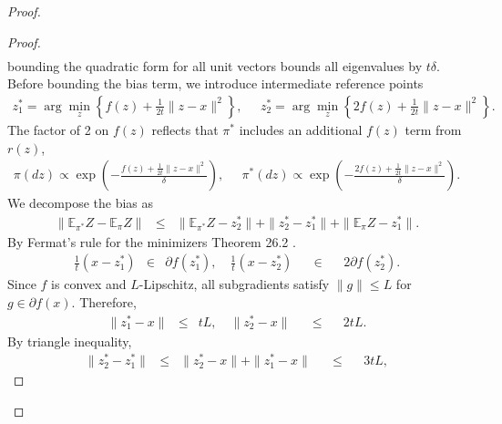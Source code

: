 \documentclass{article}
\newcommand{\E}{\mathbb{E}}
\newcommand{\amp}{\mathop{\:\:\,}\nolimits}
\theoremstyle{plain}
\theoremstyle{definition}
\theoremstyle{remark}
\begin{document}
\begin{proof}
\begin{proof}
\begin{eqnarray}
\end{eqnarray} 
bounding the quadratic form for all unit vectors bounds all eigenvalues by $t\delta$.
Before bounding the bias term, we introduce intermediate reference points
\begin{eqnarray}
    z_1^* = \arg\min_z\left\{f(z) + \frac{1}{2t}\|z-x\|^2\right\}, \amp  z_2^* = \arg\min_z\left\{2f(z) + \frac{1}{2t}\|z-x\|^2\right\}.
\end{eqnarray}
The factor of 2 on $f(z)$ reflects that $\pi^*$ includes an additional $f(z)$ term from $r(z)$,
\begin{eqnarray}
    \pi(dz) \propto \exp\left(-\frac{f(z) + \frac{1}{2t}\|z-x\|^2}{\delta}\right), \amp \pi^*(dz) \propto \exp\left(-\frac{2f(z) + \frac{1}{2t}\|z-x\|^2}{\delta}\right).
\end{eqnarray}
We decompose the bias as
\begin{eqnarray}
    \|\E_{\pi^*}Z - \E_{\pi}Z\| &\leq& \|\E_{\pi^*}Z - z_2^*\| + \|z_2^* - z_1^*\| + \|\E_\pi Z - z_1^*\|.
\end{eqnarray}
By Fermat's rule for the minimizers Theorem 26.2 \cite{bach2017}.
\begin{eqnarray}
    \frac{1}{t}(x-z_1^*) &\in& \partial f(z_1^*), \quad \frac{1}{t}(x-z_2^*)\amp\in \amp2\partial f(z_2^*).
\end{eqnarray}
Since $f$ is convex and $L$-Lipschitz, all subgradients satisfy $\|g\| \leq L$ for $g \in \partial f(x)$. Therefore,
\begin{eqnarray}
    \|z_1^* - x\| &\leq& tL, \quad \|z_2^* - x\| \amp\leq\amp 2tL.
\end{eqnarray}
By triangle inequality,
\begin{eqnarray}
    \|z_2^* - z_1^*\| &\leq& \|z_2^* - x\| + \|z_1^* - x\|\amp\leq\amp 3tL \label{eq: Triangle Inequality 3tL},
\end{eqnarray}


\end{proof}
\end{proof}
\end{document}
